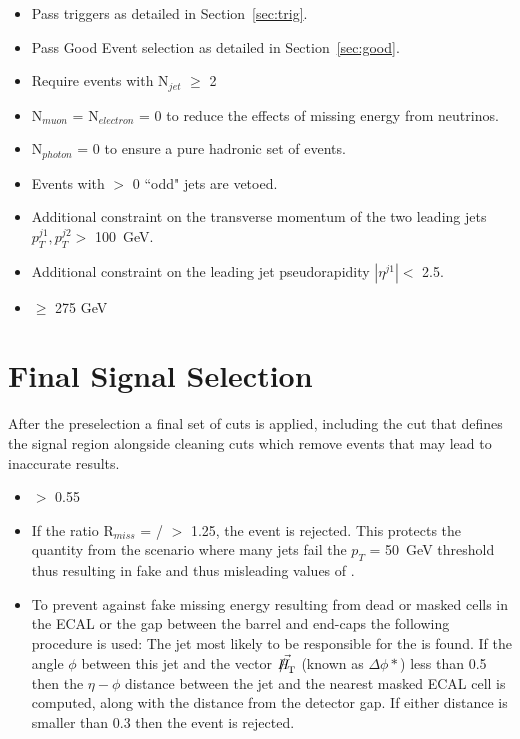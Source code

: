 \begin{itemize}
\item Pass triggers as detailed in Section~\ref{sec:trig}.
\item Pass Good Event selection as detailed in Section~\ref{sec:good}.
\item{Require events with N$_{jet}$ $\geq$ 2}
\item N$_{muon}$ = N$_{electron}$ = 0 to reduce the effects of missing energy from neutrinos.
\item N$_{photon}$ = 0 to ensure a pure hadronic set of events.
\item Events with $>$ 0 ``odd" jets are vetoed.
\item Additional constraint on the transverse momentum of the two leading jets $p^{j1}_{T},p^{j2}_{T} >$ 100~GeV.
\item Additional constraint on the leading jet pseudorapidity $|\eta^{j1}| <$ 2.5.
\item \HT $\geq$ 275 GeV
\end{itemize}



\section{Final Signal Selection}

After the preselection a final set of cuts is applied, including the \alt cut that defines the signal region alongside cleaning cuts which remove events that may lead to inaccurate results.

\begin{itemize}
\item \alt $>$ 0.55
\item{If the ratio R$_{miss}$ = \mht / \met $>$ 1.25, the event is rejected. This protects the quantity \alt from the scenario where many jets fail the $p_{T}$ = 50~GeV threshold thus resulting in fake \mht and thus misleading values of \alt. }
\item{To prevent against fake missing energy resulting from dead or masked cells in the ECAL or the gap between the barrel and end-caps the following procedure is used: The jet most likely to be responsible for the \MHT is found. If the angle $\phi$ between this jet and the vector $\vec{\MHT}$ (known as $\Delta \phi*$) less than 0.5 then the $\eta-\phi$ distance between the jet and the nearest masked ECAL cell is computed, along with the distance from the detector gap. If either distance is smaller than 0.3 then the event is rejected. }

\end{itemize}




